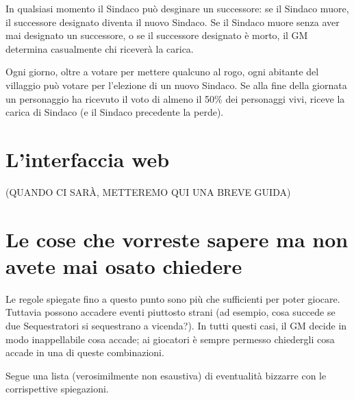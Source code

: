 \documentclass[a4paper,10pt]{article}
\begin{document}
In qualsiasi momento il Sindaco può desginare un successore: se il Sindaco muore, il successore designato diventa il nuovo Sindaco. Se il Sindaco muore senza aver mai designato un successore, o se il successore designato è morto, il GM determina casualmente chi riceverà la carica.

Ogni giorno, oltre a votare per mettere qualcuno al rogo, ogni abitante del villaggio può votare per l'elezione di un nuovo Sindaco. Se alla fine della giornata un personaggio ha ricevuto il voto di almeno il 50\% dei personaggi vivi, riceve la carica di Sindaco (e il Sindaco precedente la perde).



\pagebreak
\section{L'interfaccia web}
(QUANDO CI SARÀ, METTEREMO QUI UNA BREVE GUIDA)



\section{Le cose che vorreste sapere ma non avete mai osato chiedere}
\label{faq}

Le regole spiegate fino a questo punto sono più che sufficienti per poter giocare. Tuttavia possono accadere eventi piuttosto strani (ad esempio, cosa succede se due Sequestratori si sequestrano a vicenda?). In tutti questi casi, il GM decide in modo inappellabile cosa accade; ai giocatori è sempre permesso chiedergli cosa accade in una di queste combinazioni.

Segue una lista (verosimilmente non esaustiva) di eventualità bizzarre con le corrispettive spiegazioni.
\end{document}
